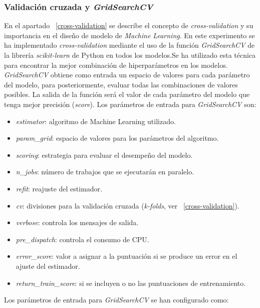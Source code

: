 \documentclass[12pt,a4paper,Spanish]{article}
\begin{document}
\subsubsection{Validación cruzada y \textit{GridSearchCV}}\label{gridsearchcv}
En el apartado ~\ref{cross-validation} se describe el concepto de \textit{cross-validation} y su importancia en el diseño de modelo de \textit{Machine Learning}. En este experimento se ha implementado \textit{cross-validation} mediante el uso de la función \textit{GridSearchCV} de la librería \textit{scikit-learn} de Python \cite{scikit-learn} en todos los modelos.Se ha utilizado esta técnica para encontrar la mejor combinación de hiperparámetros en los modelos.
\newline
\textit{GridSearchCV} obtiene como entrada un espacio de valores para cada parámetro del modelo, para posteriormente, evaluar todas las combinaciones de valores posibles. La salida de la función será el valor de cada parámetro del modelo que tenga mejor precisión (\textit{score}).
\newline
Los parámetros de entrada para \textit{GridSearchCV} son:
\begin{itemize}
	\item \textit{estimator}: algoritmo de Machine Learning utilizado.
	\item \textit{param\_grid}: espacio de valores para los parámetros del algoritmo.
	\item \textit{scoring}: estrategia para evaluar el desempeño del modelo.
	\item \textit{n\_jobs}: número de trabajos que se ejecutarán en paralelo.
	\item \textit{refit}: reajuste del estimador.
	\item \textit{cv}: divisiones para la validación cruzada (\textit{k-folds}, ver ~\ref{cross-validation}).
	\item \textit{verbose}: controla los mensajes de salida.
	\item \textit{pre\_dispatch}: controla el consumo de CPU.
	\item \textit{error\_score}: valor a asignar a la puntuación si se produce un error en el ajuste del estimador.
	\item \textit{return\_train\_score}: si se incluyen o no las puntuaciones de entrenamiento.
\end{itemize}
Los parámetros de entrada para \textit{GridSearchCV} se han configurado como:
\end{document}
